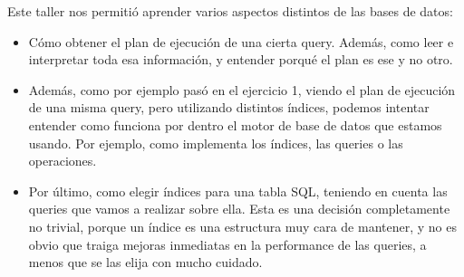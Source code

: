 Este taller nos permitió aprender varios aspectos distintos de las bases de datos:

\begin{itemize}
\item Cómo obtener el plan de ejecución de una cierta query. Además, como leer e interpretar toda esa información, y entender porqué el plan es ese y no otro.

\item Además, como por ejemplo pasó en el ejercicio 1, viendo el plan de ejecución de una misma query, pero utilizando distintos índices, podemos intentar entender como funciona por dentro el motor de base de datos que estamos usando. Por ejemplo, como implementa los índices, las queries o las operaciones.

\item Por último, como elegir índices para una tabla SQL, teniendo en cuenta las queries que vamos a realizar sobre ella. Esta es una decisión completamente no trivial, porque un índice es una estructura muy cara de mantener, y no es obvio que traiga mejoras inmediatas en la performance de las queries, a menos que se las elija con mucho cuidado.
\end{itemize}
